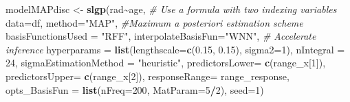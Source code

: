 \documentclass[
]{article}
\newenvironment{Shaded}{\begin{snugshade}}{\end{snugshade}}
\newcommand{\AttributeTok}[1]{\textcolor[rgb]{0.13,0.29,0.53}{#1}}
\newcommand{\CommentTok}[1]{\textcolor[rgb]{0.56,0.35,0.01}{\textit{#1}}}
\newcommand{\DecValTok}[1]{\textcolor[rgb]{0.00,0.00,0.81}{#1}}
\newcommand{\FloatTok}[1]{\textcolor[rgb]{0.00,0.00,0.81}{#1}}
\newcommand{\FunctionTok}[1]{\textcolor[rgb]{0.13,0.29,0.53}{\textbf{#1}}}
\newcommand{\NormalTok}[1]{#1}
\newcommand{\OtherTok}[1]{\textcolor[rgb]{0.56,0.35,0.01}{#1}}
\newcommand{\SpecialCharTok}[1]{\textcolor[rgb]{0.81,0.36,0.00}{\textbf{#1}}}
\newcommand{\StringTok}[1]{\textcolor[rgb]{0.31,0.60,0.02}{#1}}
\begin{document}
\begin{Shaded}
\begin{Highlighting}[]

\NormalTok{modelMAPdisc }\OtherTok{\textless{}{-}} \FunctionTok{slgp}\NormalTok{(rad}\SpecialCharTok{\textasciitilde{}}\NormalTok{age, }\CommentTok{\# Use a formula with two indexing variables}
                     \AttributeTok{data=}\NormalTok{df,}
                     \AttributeTok{method=}\StringTok{"MAP"}\NormalTok{, }\CommentTok{\#Maximum a posteriori estimation scheme}
                     \AttributeTok{basisFunctionsUsed =} \StringTok{"RFF"}\NormalTok{,}
                     \AttributeTok{interpolateBasisFun=}\StringTok{"WNN"}\NormalTok{, }\CommentTok{\# Accelerate inference}
                     \AttributeTok{hyperparams =} \FunctionTok{list}\NormalTok{(}\AttributeTok{lengthscale=}\FunctionTok{c}\NormalTok{(}\FloatTok{0.15}\NormalTok{, }\FloatTok{0.15}\NormalTok{), }
                                        \AttributeTok{sigma2=}\DecValTok{1}\NormalTok{), }
                     \AttributeTok{nIntegral =} \DecValTok{24}\NormalTok{, }
                     \AttributeTok{sigmaEstimationMethod =} \StringTok{"heuristic"}\NormalTok{, }
                     \AttributeTok{predictorsLower=} \FunctionTok{c}\NormalTok{(range\_x[}\DecValTok{1}\NormalTok{]),}
                     \AttributeTok{predictorsUpper=} \FunctionTok{c}\NormalTok{(range\_x[}\DecValTok{2}\NormalTok{]),}
                     \AttributeTok{responseRange=}\NormalTok{ range\_response,}
                     \AttributeTok{opts\_BasisFun =} \FunctionTok{list}\NormalTok{(}\AttributeTok{nFreq=}\DecValTok{200}\NormalTok{,}
                                          \AttributeTok{MatParam=}\DecValTok{5}\SpecialCharTok{/}\DecValTok{2}\NormalTok{),}
                     \AttributeTok{seed=}\DecValTok{1}\NormalTok{)}


\end{Highlighting}
\end{Shaded}
\end{document}
